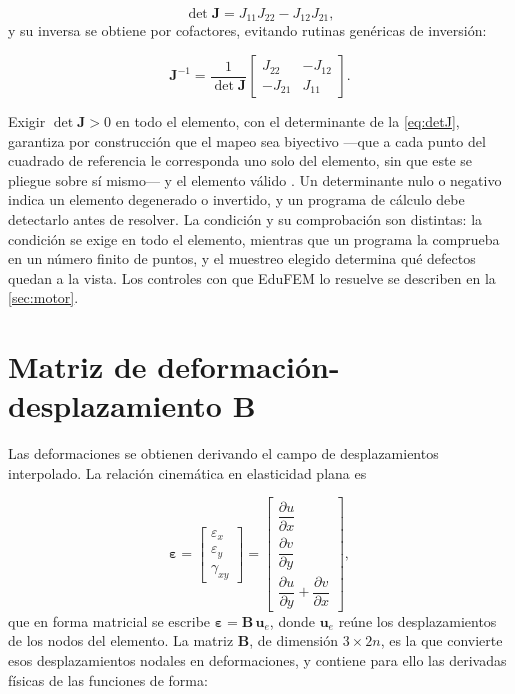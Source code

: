 \begin{equation}
\det\bm{J} = J_{11}J_{22} - J_{12}J_{21},
\label{eq:detJ}
\end{equation}
y su inversa se obtiene por cofactores, evitando rutinas genéricas de inversión:

\begin{equation}
\bm{J}^{-1} = \frac{1}{\det\bm{J}}
\begin{bmatrix}
J_{22} & -J_{12} \\
-J_{21} & J_{11}
\end{bmatrix}.
\label{eq:invJ}
\end{equation}

Exigir $\det\bm{J} > 0$ en todo el elemento, con el determinante de la \autoref{eq:detJ}, garantiza por construcción que el mapeo sea biyectivo ---que a cada punto del cuadrado de referencia le corresponda uno solo del elemento, sin que este se pliegue sobre sí mismo--- y el elemento válido \autocites[pp.~346-347]{bathe2014fem}[p.~236]{cook2002concepts}. Un determinante nulo o negativo indica un elemento degenerado o invertido, y un programa de cálculo debe detectarlo antes de resolver. La condición y su comprobación son distintas: la condición se exige en todo el elemento, mientras que un programa la comprueba en un número finito de puntos, y el muestreo elegido determina qué defectos quedan a la vista. Los controles con que EduFEM lo resuelve se describen en la \autoref{sec:motor}.

\section{Matriz de deformación-desplazamiento \texorpdfstring{$\bm{B}$}{B}}
\label{sec:matriz-b}

Las deformaciones se obtienen derivando el campo de desplazamientos interpolado. La relación cinemática en elasticidad plana es

\begin{equation}
\bm{\varepsilon} =
\begin{bmatrix} \varepsilon_x \\ \varepsilon_y \\ \gamma_{xy} \end{bmatrix}
=
\begin{bmatrix}
\dfrac{\partial u}{\partial x} \\[4pt]
\dfrac{\partial v}{\partial y} \\[4pt]
\dfrac{\partial u}{\partial y} + \dfrac{\partial v}{\partial x}
\end{bmatrix},
\label{eq:cinematica}
\end{equation}
que en forma matricial se escribe $\bm{\varepsilon} = \bm{B}\,\bm{u}_e$, donde $\bm{u}_e$ reúne los desplazamientos de los nodos del elemento. La matriz $\bm{B}$, de dimensión $3 \times 2n$, es la que convierte esos desplazamientos nodales en deformaciones, y contiene para ello las derivadas físicas de las funciones de forma:

